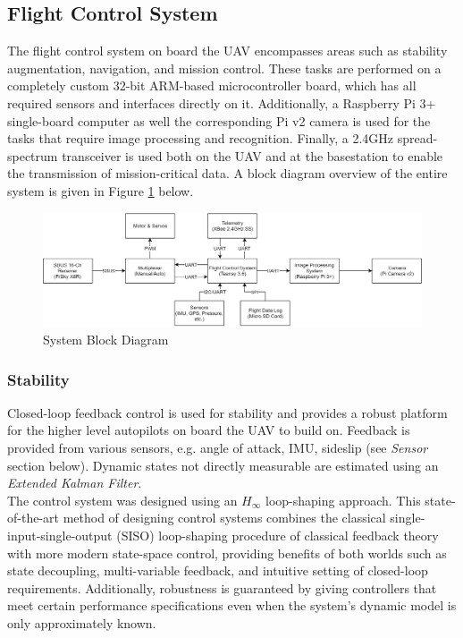 \subsection{Flight Control System}
The flight control system on board the UAV encompasses areas such as stability augmentation, navigation, and mission control. These tasks are performed on a completely custom 32-bit ARM-based microcontroller board, which has all required sensors and interfaces directly on it. Additionally, a Raspberry Pi 3+ single-board computer as well the corresponding Pi v2 camera is used for the tasks that require image processing and recognition. Finally, a 2.4GHz spread-spectrum transceiver is used both on the UAV and at the basestation to enable the transmission of mission-critical data. A block diagram overview of the entire system is given in Figure \ref{fig:SysBlockDiag} below.

\begin{figure}[H]
\centering
\includegraphics[scale=0.3]{figs/SysBlockDiagram.png}
\caption{System Block Diagram}
\label{fig:SysBlockDiag}
\end{figure}

\subsubsection{Stability}
Closed-loop feedback control is used for stability and provides a robust platform for the higher level autopilots on board the UAV to build on. Feedback is provided from various sensors, e.g. angle of attack, IMU, sideslip (see \textit{Sensor} section below). Dynamic states not directly measurable are estimated using an \textit{Extended Kalman Filter}. \\

The control system was designed using an $H_{\infty}$ loop-shaping approach. This state-of-the-art method of designing control systems combines the classical single-input-single-output (SISO) loop-shaping procedure of classical feedback theory with more modern state-space control, providing benefits of both worlds such as state decoupling, multi-variable feedback, and intuitive setting of closed-loop requirements. Additionally, robustness is guaranteed by giving controllers that meet certain performance specifications even when the system's dynamic model is only approximately known. \\

